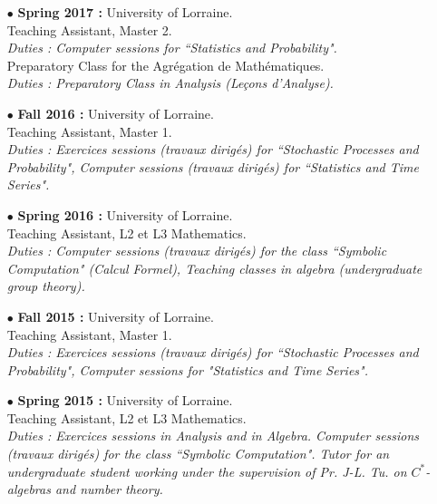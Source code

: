 \documentclass[a4paper]{article}
\begin{document}
\begin{itemize}
\item[$\bullet$] \textbf{ Spring 2017 :} University of Lorraine.\\
					Teaching Assistant, Master 2. \\
					\textit{Duties : Computer sessions for ``Statistics and Probability".}\\
					Preparatory Class for the Agrégation de Mathématiques.\\
					\textit{Duties : Preparatory Class in Analysis (Le\c{c}ons d'Analyse).}\\
	
\item[$\bullet$] \textbf{ Fall 2016 :} University of Lorraine.\\
					Teaching Assistant, Master 1.\\
					\textit{Duties : Exercices sessions (travaux dirigés) for ``Stochastic Processes and Probability", Computer sessions (travaux dirigés) for ``Statistics and Time Series".}\\

\item[$\bullet$] \textbf{ Spring 2016 :} University of Lorraine.\\	
					Teaching Assistant, L2 et L3 Mathematics. \\
					\textit{Duties : Computer sessions (travaux dirigés) for the class ``Symbolic Computation" (Calcul Formel), Teaching classes in algebra (undergraduate group theory).}\\  
 
\item[$\bullet$] \textbf{ Fall 2015 :} University of Lorraine.\\
					Teaching Assistant, Master 1.\\
					\textit{Duties : Exercices sessions (travaux dirigés) for ``Stochastic Processes and Probability", Computer sessions for "Statistics and Time Series".}\\

\item[$\bullet$] \textbf{ Spring 2015 :} University of Lorraine.\\	
					Teaching Assistant, L2 et L3 Mathematics. \\
					\textit{Duties : Exercices sessions in Analysis and in Algebra. Computer sessions (travaux dirigés) for the class ``Symbolic Computation". Tutor for an undergraduate student working under the supervision of Pr. J-L. Tu. on $C^*$-algebras and number theory.}\\   
					

\end{itemize}
\end{document}

